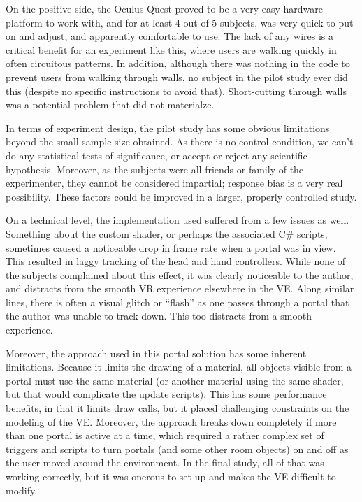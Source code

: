 \documentclass{sigchi}
\begin{document}
On the positive side, the Oculus Quest proved to be a very easy hardware platform to work with, and for at least 4 out of 5 subjects, was very quick to put on and adjust, and apparently comfortable to use.  The lack of any wires is a critical benefit for an experiment like this, where users are walking quickly in often circuitous patterns.  In addition, although there was nothing in the code to prevent users from walking through walls, no subject in the pilot study ever did this (despite no specific instructions to avoid that).  Short-cutting through walls was a potential problem that did not materialze.

In terms of experiment design, the pilot study has some obvious limitations beyond the small sample size obtained.  As there is no control condition, we can’t do any statistical tests of significance, or accept or reject any scientific hypothesis.  Moreover, as the subjects were all friends or family of the experimenter, they cannot be considered impartial; response bias is a very real possibility.  These factors could be improved in a larger, properly controlled study.

On a technical level, the implementation used suffered from a few issues as well.  Something about the custom shader, or perhaps the associated C\# scripts, sometimes caused a noticeable drop in frame rate when a portal was in view.  This resulted in laggy tracking of the head and hand controllers.  While none of the subjects complained about this effect, it was clearly noticeable to the author, and distracts from the smooth VR experience elsewhere in the VE.  Along similar lines, there is often a visual glitch or “flash” as one passes through a portal that the author was unable to track down.  This too distracts from a smooth experience.

Moreover, the approach used in this portal solution has some inherent limitations.  Because it limits the drawing of a material, all objects visible from a portal must use the same material (or another material using the same shader, but that would complicate the update scripts).  This has some performance benefits, in that it limits draw calls, but it placed challenging constraints on the modeling of the VE.  Moreover, the approach breaks down completely if more than one portal is active at a time, which required a rather complex set of triggers and scripts to turn portals (and some other room objects) on and off as the user moved around the environment.  In the final study, all of that was working correctly, but it was onerous to set up and makes the VE difficult to modify.
\end{document}
